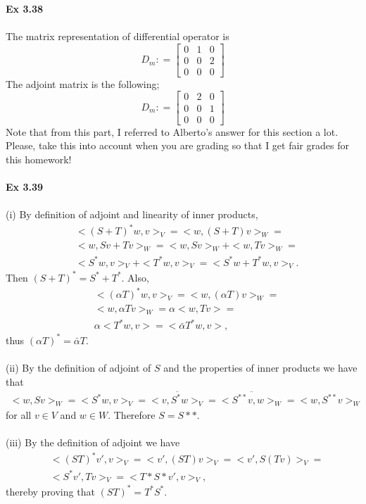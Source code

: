 \documentclass[letterpaper,12pt]{article}
\theoremstyle{definition}
\begin{document}
\begin{spacing}{1.3}{}
	\textbf{Ex 3.38} \\\\
	The matrix representation of differential operator is \\
	\[D_m : = \begin{bmatrix}
	0 & 1 & 0 \\
	0 & 0 & 2 \\
	0 & 0 & 0
	\end{bmatrix}\]
	The adjoint matrix is the following;
	\[D_m : = \begin{bmatrix}
	0 & 2 & 0 \\
	0 & 0 & 1 \\
	0 & 0 & 0
	\end{bmatrix}\]
	\setlength{\leftskip}{10pt}
	Note that from this part, I referred to Alberto's answer for this section a lot. Please, take this into account when you are grading so that I get fair grades for this homework! \\\\
	\textbf{Ex 3.39} \\\\
	(i)
	By definition of adjoint and linearity of inner products,
	\begin{align*}
	&<(S+T)^*w,v>_V=
	<w,(S+T)v>_W=\\
	&<w,Sv+Tv>_W=
	<w,Sv>_W+<w,Tv>_W=\\
	&<S^*w,v>_V + <T^*w,v>_V=
	<S^*w+T^*w,v>_V.
	\end{align*}
	Then $(S+T)^*=S^*+T^*$.
	Also,
	\begin{align*}
	&<(\alpha T)^*w,v>_V=
	<w,(\alpha T)v>_W=\\
	&<w,\alpha Tv>_W=
	\alpha<w, Tv>=\\
	&\alpha<T^*w,v>=
	<\bar{\alpha}T^*w,v>,
	\end{align*}
	thus $(\alpha T)^*=\bar{\alpha}T$. \\\\
	
	(ii)
	By the definition of adjoint of $S$ and the properties of inner products we have that
	\begin{align*}
	<w,Sv>_W=<S^*w,v>_V=
	\overline{<v,S^*w>_V}=\overline{<S^{**}v,w>_W}=
	<w,S^{**}v>_W
	\end{align*}
	for all $v\in V$ and $w\in W$.
	Therefore $S=S**$. \\\\
	
	(iii)
	By the definition of adjoint we have
	\begin{align*}
	&<(ST)^*v',v>_V=<v',(ST)v>_V=<v',S(Tv)>_V=\\
	&<S^*v',Tv>_V=<T*S*v',v>_V,
	\end{align*}
	thereby proving that $(ST)^*=T^*S^*$.
	

\end{spacing}
\end{document}
